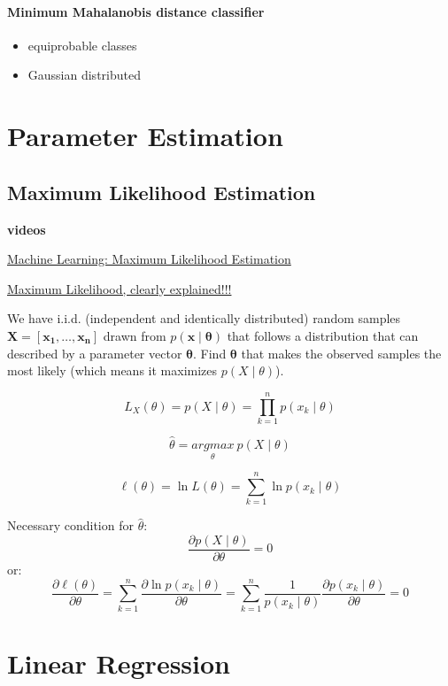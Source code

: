 \documentclass{report}
\begin{document}
\subsubsection*{Minimum Mahalanobis distance classifier}
\begin{itemize}
	\item equiprobable classes
	\item Gaussian distributed
\end{itemize}


\chapter{Parameter Estimation}

\section{Maximum Likelihood Estimation}
\begin{mdframed}
	\textbf{videos}

	\href{https://www.youtube.com/watch?v=sguol03tfWo&list=PL5yR0euE9N2kGEf7gqysMFq0Spoq0evNf&index=2}{Machine Learning: Maximum Likelihood Estimation}

	\href{https://www.youtube.com/watch?v=XepXtl9YKwc}{Maximum Likelihood, clearly explained!!!}
\end{mdframed}

We have i.i.d. (independent and identically distributed) random samples $\symbf{X} = [\symbf{x_1}, \ldots, \symbf{x_n}]$ drawn from $p(\symbf{x} \mid \symbf{\theta})$ that follows a distribution that can described by a parameter vector $\symbf{\theta}$.
Find $\symbf{\theta}$ that makes the observed samples the most likely (which means it maximizes $p(X \mid \theta)$).

\[L_X(\theta) = p(X \mid \theta) = \prod_{k=1}^{n} p(x_k \mid \theta)\]

\[\hat \theta = \underset{\theta}{argmax}\ p(X \mid \theta)\]

\[\ell(\theta) = \ln L(\theta) = \sum_{k=1}^n \ln p(x_k \mid \theta)\]

Necessary condition for $\hat \theta$:
\[\frac{\partial p(X \mid \theta)}{\partial \theta} = 0\]
or:
\[\frac{\partial \ell(\theta)}{\partial \theta} = \sum_{k=1}^n \frac{\partial \ln p(x_k \mid \theta)}{\partial \theta} = \sum_{k=1}^n \frac{1}{p(x_k \mid \theta)} \frac{\partial p(x_k \mid \theta)}{\partial \theta} = 0\]


\chapter{Linear Regression}
\end{document}
